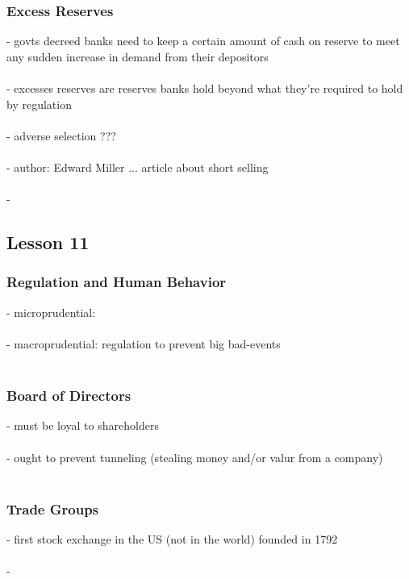 \documentclass{article} %
\begin{document}
     		\subsubsection*{Excess Reserves}
     		- govts decreed banks need to keep a certain amount of cash on reserve to meet any sudden increase in demand from their depositors \\ \\
     		- excesses reserves are reserves banks hold beyond what they're required to hold by regulation \\ \\ 
     		- adverse selection ??? \\ \\
     		- author: Edward Miller ... article about short selling \\ \\ 
     		- 
     		
     	\subsection*{Lesson 11}
     	
     		\subsubsection*{Regulation and Human Behavior}
     		- microprudential: \\ \\
     		- macroprudential: regulation to prevent big bad-events \\ \\
     		
     		\subsubsection*{Board of Directors}
     		- must be loyal to shareholders \\ \\ 
     		- ought to prevent tunneling (stealing money and/or valur from a company) \\ \\ 
     		
			\subsubsection*{Trade Groups}
			- first stock exchange in the US (not in the world) founded in 1792	\\ \\
			- 
			
\end{document}
